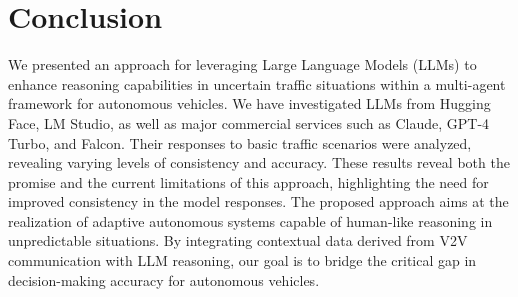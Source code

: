 \documentclass[conference]{IEEEtran}
\begin{document}




\section{Conclusion}
We presented an approach for leveraging Large Language Models (LLMs) to enhance reasoning capabilities in uncertain traffic situations within a multi-agent framework for autonomous vehicles. We have investigated LLMs from Hugging Face, LM Studio, as well as major commercial services such as Claude, GPT-4 Turbo, and Falcon. Their responses to basic traffic scenarios were analyzed, revealing varying levels of consistency and accuracy. These results reveal both the promise and the current limitations of this approach, highlighting the need for improved consistency in the model responses. The proposed approach aims at the realization of adaptive autonomous systems capable of human-like reasoning in unpredictable situations. By integrating contextual data derived from V2V communication with LLM reasoning, our goal is to bridge the critical gap in decision-making accuracy for autonomous vehicles.


\end{document}
